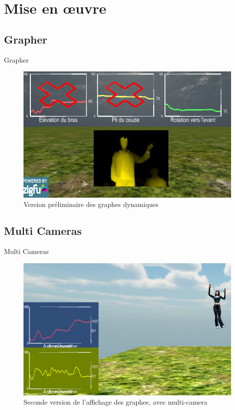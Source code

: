 \section{Mise en \oe{}uvre}

\begin{frame}
\end{frame}

\subsection{Grapher}
\begin{frame}{Grapher}
\begin{figure}
\begin{center}
\includegraphics[width=0.8\linewidth]{../images/zfm_graph}
\caption{Version préliminaire des graphes dynamiques}
\end{center}
\end{figure}
\end{frame}

\subsection{Multi Cameras}
\begin{frame}{Multi Cameras}
\begin{figure}
\begin{center}
\includegraphics[width=0.7\linewidth]{../images/multicamera}
\caption{Seconde version de l'affichage des graphes, avec multi-camera}
\end{center}
\end{figure}
\end{frame}

